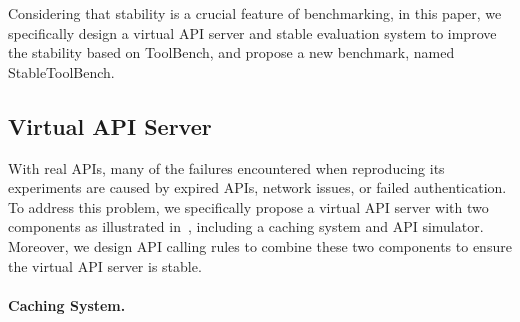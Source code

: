 

Considering that stability is a crucial feature of benchmarking, in this paper, we specifically design a virtual API server and stable evaluation system to improve the stability based on ToolBench, and propose a new benchmark, named StableToolBench.

\subsection{Virtual API Server}

With real APIs, many of the failures encountered when reproducing its experiments are caused by expired APIs, network issues, or failed authentication.
To address this problem, we specifically propose a virtual API server with two components as illustrated in~, including a caching system and API simulator.
Moreover, we design API calling rules to combine these two components to ensure the virtual API server is stable.



\paragraph{Caching System.}

